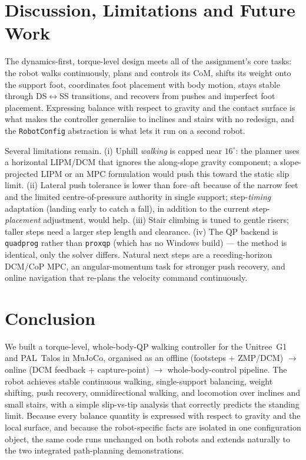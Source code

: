 \documentclass[11pt]{article}
\begin{document}
\section{Discussion, Limitations and Future Work}
\label{sec:discussion}
The dynamics-first, torque-level design meets all of the assignment's core tasks:
the robot walks continuously, plans and controls its CoM, shifts its weight onto
the support foot, coordinates foot placement with body motion, stays stable through
DS$\leftrightarrow$SS transitions, and recovers from pushes and imperfect foot
placement. Expressing balance with respect to gravity and the contact surface is
what makes the controller generalise to inclines and stairs with no redesign, and
the \texttt{RobotConfig} abstraction is what lets it run on a second robot.

Several limitations remain. (i) Uphill \emph{walking} is capped near $16^{\circ}$:
the planner uses a horizontal LIPM/DCM that ignores the along-slope gravity
component; a slope-projected LIPM or an MPC formulation would push this toward the
static slip limit. (ii) Lateral push tolerance is lower than fore--aft because of
the narrow feet and the limited centre-of-pressure authority in single support;
step-\emph{timing} adaptation (landing early to catch a fall), in addition to the
current step-\emph{placement} adjustment, would help. (iii) Stair climbing is tuned
to gentle risers; taller steps need a larger step length and clearance. (iv) The QP
backend is \texttt{quadprog} rather than \texttt{proxqp} (which has no Windows
build) --- the method is identical, only the solver differs. Natural next steps are
a receding-horizon DCM/CoP MPC, an angular-momentum task for stronger push
recovery, and online navigation that re-plans the velocity command continuously.

\section{Conclusion}
\label{sec:conclusion}
We built a torque-level, whole-body-QP walking controller for the Unitree~G1 and
PAL~Talos in MuJoCo, organised as an offline (footsteps + ZMP/DCM) $\to$ online
(DCM feedback + capture-point) $\to$ whole-body-control pipeline. The robot achieves
stable continuous walking, single-support balancing, weight shifting, push
recovery, omnidirectional walking, and locomotion over inclines and small stairs,
with a simple slip-vs-tip analysis that correctly predicts the standing limit.
Because every balance quantity is expressed with respect to gravity and the local
surface, and because the robot-specific facts are isolated in one configuration
object, the same code runs unchanged on both robots and extends naturally to the
two integrated path-planning demonstrations.
\end{document}

